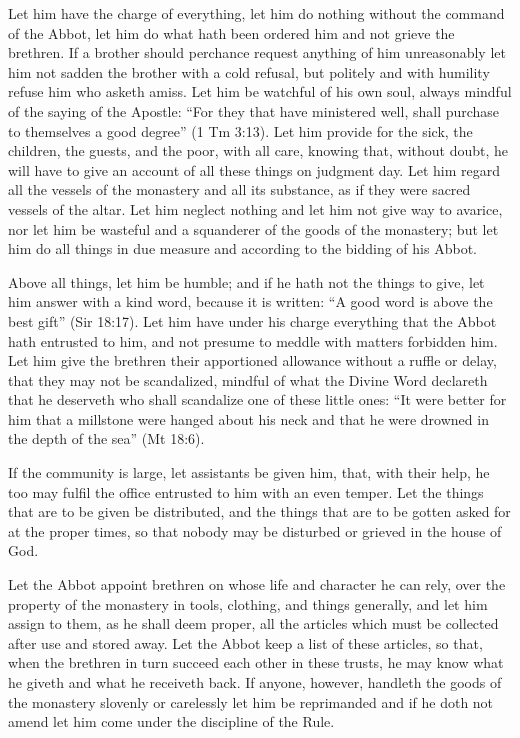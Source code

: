 Let him have the charge of everything, let him do nothing without the command of the Abbot, let him do what hath been ordered him and not grieve the brethren. If a brother should perchance request anything of him unreasonably let him not sadden the brother with a cold refusal, but politely and with humility refuse him who asketh amiss. Let him be watchful of his own soul, always mindful of the saying of the Apostle: ``For they that have ministered well, shall purchase to themselves a good degree'' (1 Tm 3:13). Let him provide for the sick, the children, the guests, and the poor, with all care, knowing that, without doubt, he will have to give an account of all these things on judgment day. Let him regard all the vessels of the monastery and all its substance, as if they were sacred vessels of the altar. Let him neglect nothing and let him not give way to avarice, nor let him be wasteful and a squanderer of the goods of the monastery; but let him do all things in due measure and according to the bidding of his Abbot.

Above all things, let him be humble; and if he hath not the things to give, let him answer with a kind word, because it is written: ``A good word is above the best gift'' (Sir 18:17). Let him have under his charge everything that the Abbot hath entrusted to him, and not presume to meddle with matters forbidden him. Let him give the brethren their apportioned allowance without a ruffle or delay, that they may not be scandalized, mindful of what the Divine Word declareth that he deserveth who shall scandalize one of these little ones: ``It were better for him that a millstone were hanged about his neck and that he were drowned in the depth of the sea'' (Mt 18:6).

If the community is large, let assistants be given him, that, with their help, he too may fulfil the office entrusted to him with an even temper. Let the things that are to be given be distributed, and the things that are to be gotten asked for at the proper times, so that nobody may be disturbed or grieved in the house of God.


Let the Abbot appoint brethren on whose life and character he can rely, over the property of the monastery in tools, clothing, and things generally, and let him assign to them, as he shall deem proper, all the articles which must be collected after use and stored away. Let the Abbot keep a list of these articles, so that, when the brethren in turn succeed each other in these trusts, he may know what he giveth and what he receiveth back. If anyone, however, handleth the goods of the monastery slovenly or carelessly let him be reprimanded and if he doth not amend let him come under the discipline of the Rule.

